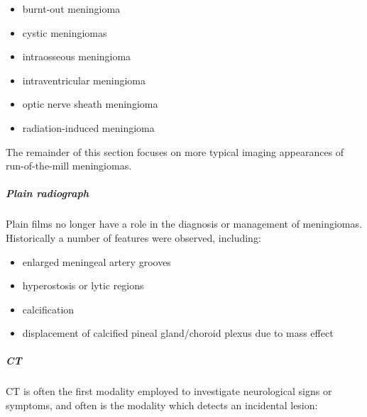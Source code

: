 \begin{itemize}
	\item
	burnt-out meningioma
	\item
	cystic meningiomas
	\item
	intraosseous meningioma
	\item
	intraventricular meningioma
	\item
	optic nerve sheath meningioma
	\item
	radiation-induced meningioma
\end{itemize}

The remainder of this section focuses on more typical imaging appearances of run-of-the-mill meningiomas.


\subparagraph{Plain radiograph}

Plain films no longer have a role in the diagnosis or management of meningiomas. Historically a number of features were observed, including:

\begin{itemize}
	\item
	enlarged meningeal artery grooves
	\item
	hyperostosis or lytic regions
	\item
	calcification
	\item
	displacement of calcified pineal gland/choroid plexus due to mass effect
\end{itemize}


\subparagraph{CT}

CT is often the first modality employed to investigate neurological signs or symptoms, and often is the modality which detects an incidental lesion:

